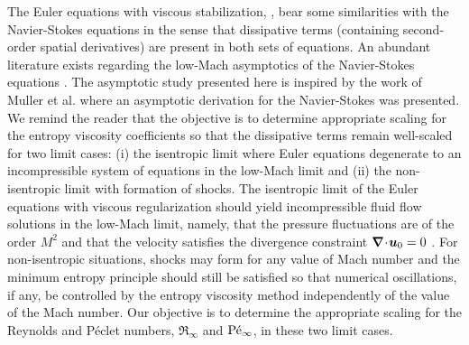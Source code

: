 The Euler equations with viscous stabilization, , bear some similarities with the Navier-Stokes equations in the sense that dissipative terms (containing second-order spatial derivatives) are present in both sets of equations. An abundant literature exists regarding the low-Mach asymptotics of the Navier-Stokes equations \cite{LowMach1, LowMach2, LowMach3, Muller}.   
%
The asymptotic study presented here is inspired by the work of Muller et al. \cite{Muller} where an asymptotic derivation for the Navier-Stokes was presented. 
We remind the reader that the objective is to determine appropriate scaling for the entropy viscosity coefficients so that the dissipative terms remain well-scaled for two limit cases: 
(i) the isentropic limit where Euler equations degenerate to an incompressible system of equations in the low-Mach limit and 
(ii) the non-isentropic limit with formation of shocks. 
The isentropic limit of the Euler equations with viscous regularization should yield incompressible fluid flow solutions in the low-Mach limit, namely, that the pressure fluctuations are of the order $M^2$ and that the velocity satisfies the divergence constraint $\boldsymbol{\nabla}\! \cdot \! \boldsymbol u_0 = 0$ \cite{LowMach1, LowMach2, LowMach3}. For non-isentropic situations, shocks may form for any value of Mach number and the minimum entropy principle should still be satisfied so that numerical oscillations, if any, be controlled by the entropy viscosity method independently of the value of the Mach number.
Our objective is to determine the appropriate scaling for the Reynolds and P\'eclet numbers, $\Re_\infty$ and $\textrm{P\'e}_\infty$, in these two limit cases.

